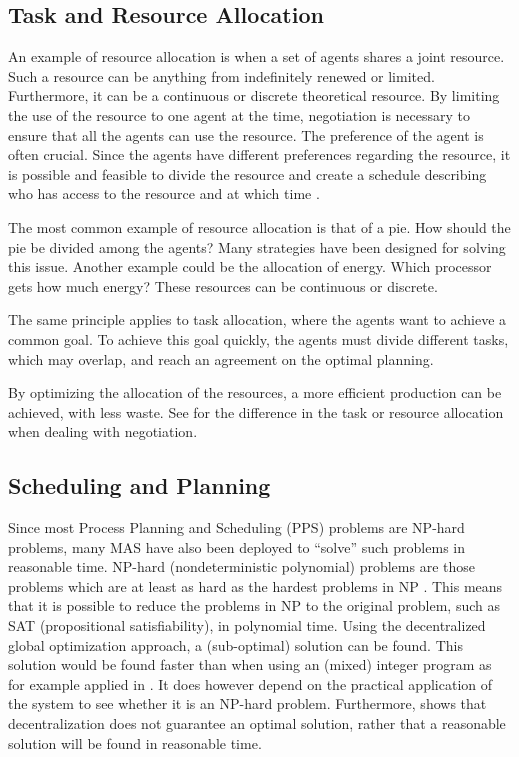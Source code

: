 \subsection{Task and Resource Allocation}
An example of resource allocation is when a set of agents shares a joint resource. Such a resource can be anything from indefinitely renewed or limited. Furthermore, it can be a continuous or discrete theoretical resource. By limiting the use of the resource to one agent at the time, negotiation is necessary to ensure that all the agents can use the resource. The preference of the agent is often crucial. Since the agents have different preferences regarding the resource, it is possible and feasible to divide the resource and create a schedule describing who has access to the resource and at which time \citep{fatima2014principles}. 

The most common example of resource allocation is that of a pie. How should the pie be divided among the agents? Many strategies have been designed for solving this issue. Another example could be the allocation of energy. Which processor gets how much energy? These resources can be continuous or discrete.

The same principle applies to task allocation, where the agents want to achieve a common goal. To achieve this goal quickly, the agents must divide different tasks, which may overlap, and reach an agreement on the optimal planning. 

By optimizing the allocation of the resources, a more efficient production can be achieved, with less waste. See  for the difference in the task or resource allocation when dealing with negotiation.

\subsection{Scheduling and Planning}
Since most Process Planning and Scheduling (PPS) problems are NP-hard problems, many MAS have also been deployed to ``solve'' such problems in reasonable time. NP-hard (nondeterministic polynomial) problems are those problems which are at least as hard as the hardest problems in NP \citep{hromkovivc2013algorithmics}. This means that it is possible to reduce the problems in NP to the original problem, such as SAT (propositional satisfiability), in polynomial time. Using the decentralized global optimization approach, a (sub-optimal) solution can be found. This solution would be found faster than when using an (mixed) integer program as for example applied in \citep{feng2014multi}. It does however depend on the practical application of the system to see whether it is an NP-hard problem. Furthermore, \citep{feng2014multi} shows that decentralization does not guarantee an optimal solution, rather that a reasonable solution will be found in reasonable time.

